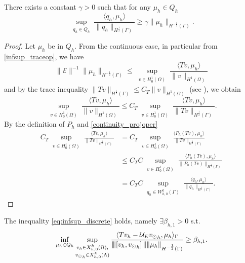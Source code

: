\begin{lemma}\label{lemma:trspace_infsup} 
There exists a constant $\gamma >0$ such that for any $\mu_h\in Q_h$
\begin{equation*}
\sup_{\substack{q_h \in Q_h}} \frac{\langle q_h , \mu_h \rangle}{ \|q_h\|_{H^{\frac 12}(\Gamma)}} \geq \gamma \|\mu_h\|_{H^{-\frac 12}(\Gamma)}.
\end{equation*} 
\end{lemma}
\begin{proof}
Let $\mu_h$ be in $Q_h$. From the continuous case, in particular from \eqref{infsup_traceop}, we have
\begin{equation*}
\|\mathcal{E}\|^{-1} \|\mu_h\|_{H^{-\frac 12}(\Gamma)} \leq \sup_{\substack{v \in H^1_0(\Omega)}} \frac{\langle Tv , \mu_h \rangle}{\|v\|_{H^1(\Omega)}} 
\end{equation*}
and by the trace inequality $\|Tv\|_{H^\frac 12 (\Gamma)} \leq C_T \|v\|_{H^1(\Omega)}$ (see \cite[7.56]{adams1975pure}), we obtain 
\begin{equation*}
\sup_{\substack{v \in H^1_0(\Omega)}} \frac{\langle T v , \mu_h \rangle}{\|v\|_{H^1(\Omega)}}
\leq C_T \sup_{\substack{v \in H^1_0(\Omega)}} \frac{\langle T v , \mu_h \rangle}{ \|Tv\|_{H^{\frac 12}(\Gamma)}}.
\end{equation*}
By the definition of $P_h$ and \eqref{continuity_projoper} 
\begin{equation*}
\begin{split}
C_T \sup_{\substack{v \in H^1_0(\Omega)}} \frac{\langle T v , \mu_h \rangle}{ \|Tv\|_{H^{\frac 12}(\Gamma)}}&= C_T \sup_{\substack{v \in H^1_0(\Omega)}} \frac{\langle P_h(T v) , \mu_h \rangle}{ \|Tv\|_{H^{\frac 12}(\Gamma)}}\\
&\leq  C_T C \sup_{\substack{v \in H^1_0(\Omega)}} \frac{\langle P_h(T v) , \mu_h \rangle}{ \|P_h(Tv)\|_{H^{\frac 12}(\Gamma)}}\\
&= C_T C \sup_{\substack{q_h \in W_{h,0}^k(\Gamma)}} \frac{\langle q_h , \mu_h \rangle}{  \|q_h\|_{H^{\frac 12}(\Gamma)}}.
\end{split}
\end{equation*}
\end{proof}

\begin{theorem} The inequality \eqref{eq:infsup_discrete} holds, namely 
$\exists \beta_{h,1} >0$ s.t.
\begin{equation}\label{inf_sup_discrete_prob1}
\inf_{\mu_h \in Q_h} 
\sup_{\substack{v_h \in X_{h,0}^k(\Omega),\\ {\vd}_h \in X_{h,0}^k(\Lambda)}} \frac{ \langle T v_h - \mathcal{U}_E {\vd}_h, \mu_h \rangle _{\Gamma}} {\vertiii{[v_h, {\vd} _h]} \|\mu_h\|_{H^{-\frac 12 }(\Gamma)}} 
\geq \beta_{h,1}. 
\end{equation}
\end{theorem}

